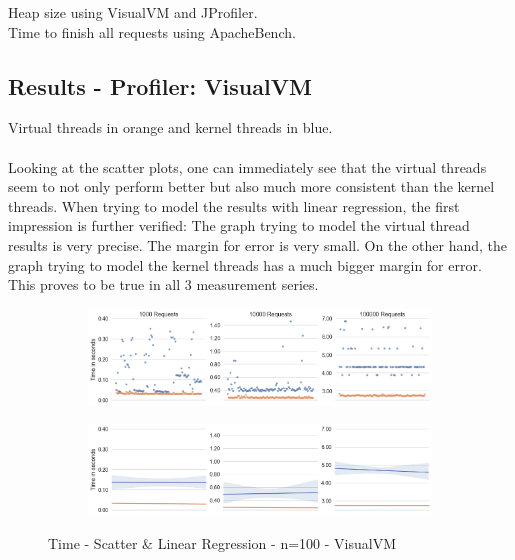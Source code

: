 Heap size using VisualVM and JProfiler.
\\
Time to finish all requests using ApacheBench.


\subsection{Results - Profiler: VisualVM}
Virtual threads in orange and kernel threads in blue.
\\
\\
Looking at the scatter plots, one can immediately see that the virtual threads seem to not only perform better but also much more consistent than the kernel threads. When trying to model the results with linear regression, the first impression is further verified: The graph trying to model the virtual thread results is very precise. The margin for error is very small. On the other hand, the graph trying to model the kernel threads has a much bigger margin for error. This proves to be true in all 3 measurement series.

\begin{figure}[H]
  \centering
  \begin{subfigure}[b]{1.0\textwidth}
    \includegraphics[width=1.0\linewidth]{img/footprint/scatter-100.png}
  \end{subfigure}
  \par\medskip %
  \begin{subfigure}[b]{1.0\textwidth}
    \includegraphics[width=1.0\linewidth]{img/footprint/linres-100.png}
  \end{subfigure}
  \caption{Time - Scatter \& Linear Regression - n=100 - VisualVM}
\end{figure}

